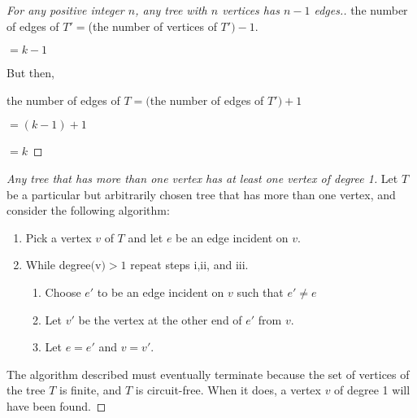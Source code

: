 \documentclass[12pt]{article}
\newenvironment{modenumerate}
  {\enumerate\setupmodenumerate}
  {\endenumerate}
\newif\ifmoditem
\newcommand{\setupmodenumerate}{%
  \global\moditemfalse
  \let\origmakelabel\makelabel
  \def\moditem##1{\global\moditemtrue\def\mesymbol{##1}\item}%
  \def\makelabel##1{%
    \origmakelabel{##1\ifmoditem\rlap{\mesymbol}\fi\enspace}%
    \global\moditemfalse}%
}
\begin{document}
\begin{modenumerate}
\begin{proof}[For any positive integer $n$, any tree with $n$ vertices has $n-1$ edges.]
    the number of edges of $T' = $(the number of vertices of $T') - 1$.

    $= k - 1$

    But then,

    the number of edges of $T = ($the number of edges of $T') + 1$

    $= (k-1)+1$

    $= k$
  \end{proof}

  \begin{proof}[Any tree that has more than one vertex has at least one vertex of degree 1]
    Let $T$ be a particular but arbitrarily chosen tree that has more than one vertex, and consider the
    following algorithm:
    \begin{enumerate}
    \item Pick a vertex $v$ of $T$ and let $e$ be an edge incident on $v$.
    \item While degree$($v$) > 1$ repeat steps i,ii, and iii.
      \begin{enumerate}
      \item Choose $e'$ to be an edge incident on $v$ such that $e' \neq e$
      \item Let $v'$ be the vertex at the other end of $e'$ from $v$.
      \item Let $e = e'$ and $v = v'$.
      \end{enumerate}
    \end{enumerate}
    The algorithm described must eventually terminate because the set of vertices of the tree $T$ is finite,
    and $T$ is circuit-free. When it does, a vertex $v$ of degree 1 will have been found.
  \end{proof}
\end{modenumerate}
\end{document}
